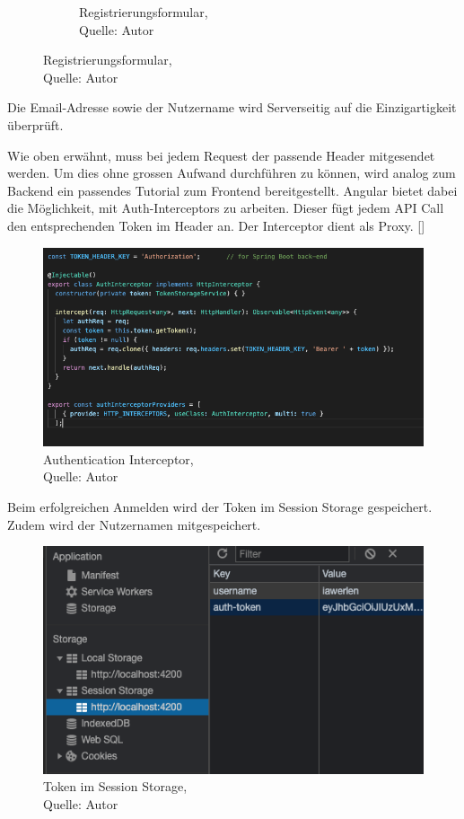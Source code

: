 \begin{figure}[H]
\begin{subfigure}[b]{0.4\textwidth}
 		\caption[Registrierungsformular]{Registrierungsformular,\\ Quelle: Autor}
 		\label{img: registerForm}
 	\end{subfigure}
\end{figure} 
 
 Die Email-Adresse sowie der Nutzername wird Serverseitig auf die Einzigartigkeit überprüft. 
 
Wie oben erwähnt, muss bei jedem Request der passende Header mitgesendet werden. Um dies ohne grossen Aufwand durchführen zu können, wird analog zum Backend ein passendes Tutorial zum Frontend bereitgestellt. Angular bietet dabei die Möglichkeit, mit Auth-Interceptors zu arbeiten. Dieser fügt jedem API Call den entsprechenden Token im Header an. Der Interceptor dient als Proxy. [\cite{authAPIAngular}]

\begin{figure}[H]
	\centering
	\includegraphics[width=1\textwidth]{images/authInterceptor.PNG}
	\caption[Authentication Interceptor]{Authentication Interceptor,\\ Quelle: Autor}
	\label{img: authInterceptor}
\end{figure} 
  
Beim erfolgreichen Anmelden wird der Token im Session Storage gespeichert. Zudem wird der Nutzernamen mitgespeichert. 

\begin{figure}[H]
 	\centering
 	\includegraphics[scale=0.5]{images/sessionStorage.PNG}
 	\caption[Token im Session Storage]{Token im Session Storage,\\ Quelle: Autor}
 	\label{img: sessionStorage}
\end{figure} 
 
